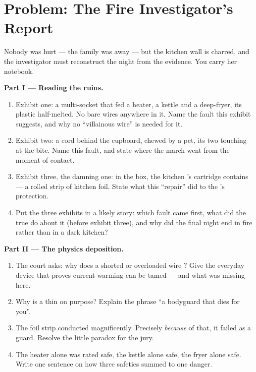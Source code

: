 \section{Problem: The Fire Investigator's Report}

\begin{problem}\label{pb:g7:short-circuits-safety:1}
Nobody was hurt --- the family was away --- but the kitchen wall
is charred, and the investigator must reconstruct the night from
the evidence. You carry her notebook.

\medskip\noindent\textbf{Part I --- Reading the ruins.}
\begin{enumerate}
  \item Exhibit one: a multi-socket that fed a heater, a kettle
        and a deep-fryer, its plastic half-melted. No bare wires
        anywhere in it. Name the fault this exhibit suggests,
        and why no ``villainous wire'' is needed for it.
  \item Exhibit two: a cord behind the cupboard, chewed by a
        pet, its two  touching at the bite. Name this
        fault, and state where the march went from the moment of
        contact.
  \item Exhibit three, the damning one: in the  box, the
        kitchen 's  cartridge contains --- a rolled
        strip of kitchen foil. State what this ``repair'' did to
        the 's protection.
  \item Put the three exhibits in a likely story: which fault
        came first, what did the true  do about it (before
        exhibit three), and why did the final night end in fire
        rather than in a dark kitchen?
\end{enumerate}

\medskip\noindent\textbf{Part II --- The physics deposition.}
\begin{enumerate}[resume]
  \item The court asks: why does a shorted or overloaded wire
        \emph{}? Give the everyday device that proves
        current-warming can be tamed --- and what was missing
        here.
  \item Why is a  thin on purpose? Explain the phrase ``a
        bodyguard that dies for you''.
  \item The foil strip conducted magnificently. Precisely
        \emph{because} of that, it failed as a guard. Resolve
        the little paradox for the jury.
  \item The heater alone was rated safe, the kettle alone safe,
        the fryer alone safe. Write one sentence on how three
        safeties summed to one danger.
\end{enumerate}


\end{problem}
